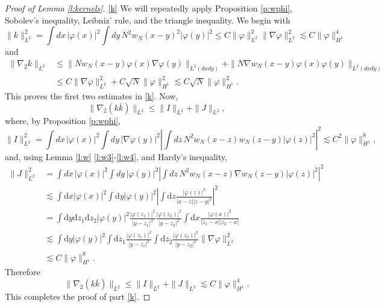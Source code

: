 \documentclass[11pt,a4paper,draft,DIV11]{scrartcl}	%
\newcommand{\di}{\textrm{d}}		%
\newcommand{\norm}[1]{\lVert#1\rVert}	%
\begin{document}
\begin{proof}[Proof of Lemma \ref{l:kernels}]
\hspace{-0.3em} %
\ref{k} We will repeatedly apply Proposition \ref{p:wphi}, Sobolev's
  inequality, Leibniz' rule, and the triangle inequality. We begin with
  \[
    \| k \|_{L^2}^2 = \int dx \, |\varphi(x)|^2 \int dy \, N^2 w_N(x-y)^2
    |\varphi(y)|^2 \le C \| \varphi \|_{L^2}^2 \| \nabla \varphi \|_{L^2}^2
    \apprle C \| \varphi \|_{H^1}^4
  \]
  and
  \begin{align*}
    \| \nabla_2 k \|_{L^2} & \le \| N w_N(x-y) \varphi(x) \nabla \varphi(y)
    \|_{L^2(dx dy)} + \| N \nabla w_N(x-y) \varphi(x) \varphi(y) \|_{L^2(dx dy)} \\
    & \le C \| \nabla \varphi \|_{L^2}^2 + C \sqrt{N} \| \varphi \|_{H^1}^2
    \apprle C \sqrt{N} \| \varphi \|_{H^1}^2.
  \end{align*}
  This proves the first two estimates in \ref{k}. Now,
  \[
    \| \nabla_2 (k \overline{k}) \|_{L^2} \le \| I \|_{L^2} + \| J \|_{L^2},
  \]
  where, by Proposition \ref{p:wphi},
  \[
    \| I \|_{L^2}^2 = \int dx \, |\varphi(x)|^2 \int dy \, |\nabla
    \varphi(y)|^2 \left| \int dz \, N^2 w_N(x-z) w_N(z-y) |\varphi(z)|^2
    \right|^2 \apprle C^2 \| \varphi \|_{H^1}^8,
  \]
  and, using Lemma \ref{l:w} \ref{l:w3}-\ref{l:w4}, and Hardy's inequality,
  \begin{align*}
    \| J \|_{L^2}^2 & = \int dx \, |\varphi(x)|^2 \int dy \, |\varphi(y)|^2
    \left| \int dz \, N^2 w_N(x-z) \nabla w_N(z-y) |\varphi(z)|^2 \right|^2 \\
& \apprle \int \di x\lvert\varphi(x)\rvert^2 \int \di y \lvert \varphi(y)\rvert^2
\left\lvert \int \di z \frac{\lvert\varphi(z)\rvert^2}{\lvert x-z\rvert
\lvert z-y\rvert^2} \right\rvert^2 \\
& = \int \di y\di z_1 \di z_2 \lvert \varphi(y)\rvert^2 \frac{\lvert \varphi(z_1)\rvert^2}{\lvert y-z_1\rvert^2} \frac{\lvert\varphi(z_2)\rvert^2}{\lvert y-z_2\rvert^2} \int \di x \frac{\lvert \varphi(x)\rvert^2}{\lvert z_1-x\rvert \lvert z_2 - x\rvert} \\
& \apprle \int \di y \lvert \varphi(y)\rvert^2 \int \di z_1 \frac{\lvert \varphi(z_1)\rvert^2}{\lvert y-z_1\rvert^2} \int \di z_2 \frac{\lvert \varphi(z_2)\rvert^2}{\lvert y-z_2\rvert^2} \norm{\nabla \varphi}_{L^2}^2\\
& \apprle C \norm{\varphi}_{H^1}^8.
  \end{align*}
  Therefore
  \[
    \| \nabla_2 (k \overline{k}) \|_{L^2} \le \| I \|_{L^2} + \| J \|_{L^2}
    \apprle C \| \varphi \|_{H^1}^4.
  \]
  This completes the proof of part \ref{k}.


\end{proof}
\end{document}
